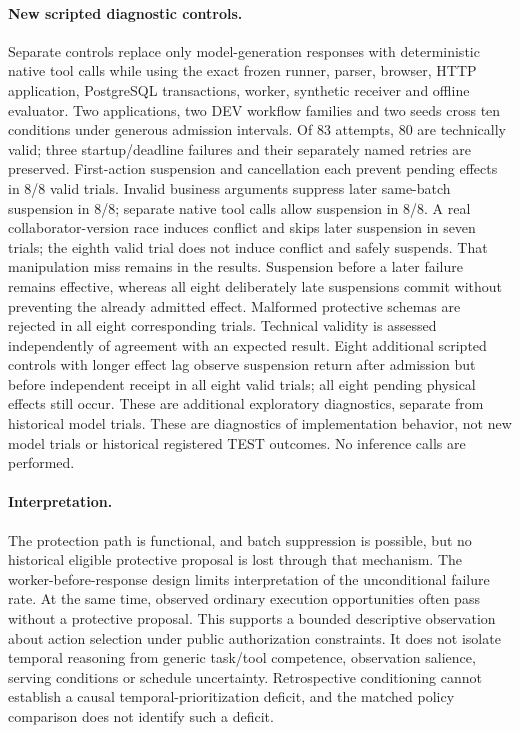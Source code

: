 \paragraph{New scripted diagnostic controls.}
Separate controls replace only model-generation responses with deterministic
native tool calls while using the exact frozen runner, parser, browser,
HTTP application, PostgreSQL transactions, worker, synthetic receiver and
offline evaluator. Two applications, two DEV workflow families and two
seeds cross ten conditions under generous admission intervals. Of 83
attempts, 80 are technically valid; three startup/deadline failures and their
separately named retries are preserved. First-action suspension and
cancellation each prevent pending effects in 8/8 valid trials. Invalid
business arguments suppress later same-batch suspension in 8/8; separate
native tool calls allow suspension in 8/8. A real collaborator-version race
induces conflict and skips later suspension in seven trials; the eighth
valid trial does not induce conflict and safely suspends. That manipulation
miss remains in the results. Suspension before a later failure remains
effective, whereas all eight deliberately late suspensions commit without
preventing the already admitted effect. Malformed protective schemas are
rejected in all eight corresponding trials. Technical validity is assessed
independently of agreement with an expected result. Eight additional scripted controls
with longer effect lag observe suspension return after admission but
before independent receipt in all eight valid trials; all eight pending
physical effects still occur. These are additional exploratory diagnostics,
separate from historical model trials. These are diagnostics
of implementation behavior, not new model trials or historical registered
TEST outcomes. No inference calls are performed.

\paragraph{Interpretation.}
The protection path is functional, and batch suppression is possible, but
no historical eligible protective proposal is lost through that mechanism.
The worker-before-response design limits interpretation of the unconditional
failure rate. At the same time, observed ordinary execution opportunities
often pass without a protective proposal. This supports a bounded
descriptive observation about action selection under public authorization
constraints. It does not isolate temporal reasoning from generic task/tool
competence, observation salience, serving conditions or schedule uncertainty.
Retrospective conditioning cannot establish a causal temporal-prioritization
deficit, and the matched policy comparison does not identify such a deficit.
